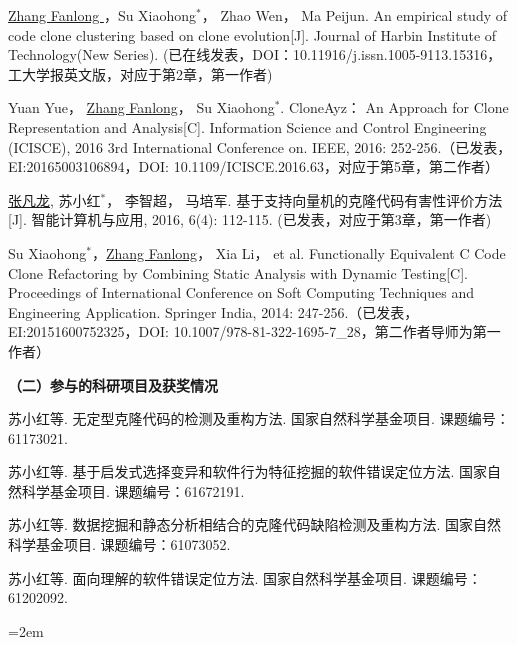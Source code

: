\begin{publist}

\item
\underline{Zhang Fanlong }，Su Xiaohong{$^*$}， Zhao Wen， Ma Peijun. An empirical study of code clone clustering based on clone evolution[J]. Journal of Harbin Institute of Technology(New Series). (已在线发表，DOI：10.11916/j.issn.1005-9113.15316，工大学报英文版，对应于第2章，第一作者)

\item
Yuan Yue， \underline{Zhang Fanlong}， Su Xiaohong{$^*$}. CloneAyz： An Approach for Clone Representation and Analysis[C]. Information Science and Control Engineering (ICISCE), 2016 3rd International Conference on. IEEE, 2016: 252-256.（已发表，EI:20165003106894，DOI:	10.1109/ICISCE.2016.63，对应于第5章，第二作者）
\item
\underline{张凡龙}, 苏小红{$^*$}， 李智超， 马培军. 基于支持向量机的克隆代码有害性评价方法[J]. 智能计算机与应用, 2016, 6(4): 112-115. (已发表，对应于第3章，第一作者)

\item
Su Xiaohong{$^*$}，\underline{Zhang Fanlong}， Xia Li， et al. Functionally Equivalent C Code Clone Refactoring by Combining Static Analysis with Dynamic Testing[C]. Proceedings of International Conference on Soft Computing Techniques and Engineering Application. Springer India, 2014: 247-256.（已发表，EI:20151600752325，DOI: 10.1007/978-81-322-1695-7\_28，第二作者导师为第一作者）
\end{publist}




\noindent\textbf{（二）参与的科研项目及获奖情况}
\begin{publist}
\item	
苏小红等. 无定型克隆代码的检测及重构方法. 国家自然科学基金项目. 课题编号：61173021.
\item 
苏小红等. 基于启发式选择变异和软件行为特征挖掘的软件错误定位方法. 国家自然科学基金项目. 课题编号：61672191.
\item
苏小红等. 数据挖掘和静态分析相结合的克隆代码缺陷检测及重构方法. 国家自然科学基金项目. 课题编号：61073052.
\item
苏小红等. 面向理解的软件错误定位方法. 国家自然科学基金项目. 课题编号：61202092.

\end{publist}
\vfill
{}\hangindent=2em\noindent

\setlength{\parindent}{2em}
